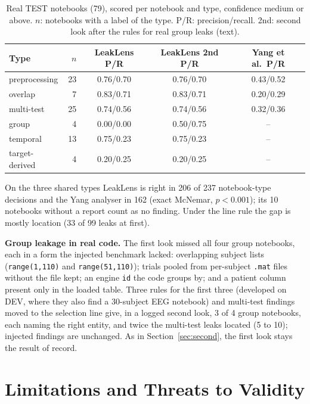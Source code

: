 \documentclass[conference]{IEEEtran}
\newcommand{\tool}{LeakLens}
\newcommand{\code}[1]{\texttt{#1}}
\begin{document}
\begin{table}[t]
\centering
\caption{Real TEST notebooks (79), scored per notebook and type, confidence medium or above. $n$: notebooks with a
label of the type. P/R: precision/recall. 2nd: second look after the rules for real group leaks (text).}
\label{tab:real}
\footnotesize
\setlength{\tabcolsep}{3.5pt}
\begin{tabular}{@{}lrccc@{}}
\toprule
Type & $n$ & \tool{} P/R & \tool{} 2nd P/R & Yang et al.\ P/R \\
\midrule
preprocessing & 23 & 0.76/0.70 & 0.76/0.70 & 0.43/0.52 \\
overlap & 7 & 0.83/0.71 & 0.83/0.71 & 0.20/0.29 \\
multi-test & 25 & 0.74/0.56 & 0.74/0.56 & 0.32/0.36 \\
group & 4 & 0.00/0.00 & 0.50/0.75 & -- \\
temporal & 13 & 0.75/0.23 & 0.75/0.23 & -- \\
target-derived & 4 & 0.20/0.25 & 0.20/0.25 & -- \\
\bottomrule
\end{tabular}
\end{table}

On the three shared types \tool{} is right in 206 of 237 notebook-type decisions and the Yang analyser in 162
(exact McNemar, $p<0.001$); its 10 notebooks without a report count as no finding. Under the line rule the gap is mostly location (33 of 99 leaks at first).

\textbf{Group leakage in real code.} The first look missed all four group notebooks, each in a
form the injected benchmark lacked: overlapping subject lists (\code{range(1,110)} and \code{range(51,110)});
trials pooled from per-subject \code{.mat} files without the file kept; an engine \code{id} the code groups by;
and a patient column present only in the loaded table. Three rules for the first three (developed on DEV, where
they also find a 30-subject EEG notebook) and multi-test findings moved to the selection line give, in a logged
second look, 3 of 4 group notebooks, each naming the right entity, and twice the multi-test leaks located (5 to
10); injected findings are unchanged. As in Section~\ref{sec:second}, the first look stays the result of record.

\section{Limitations and Threats to Validity}
\end{document}
